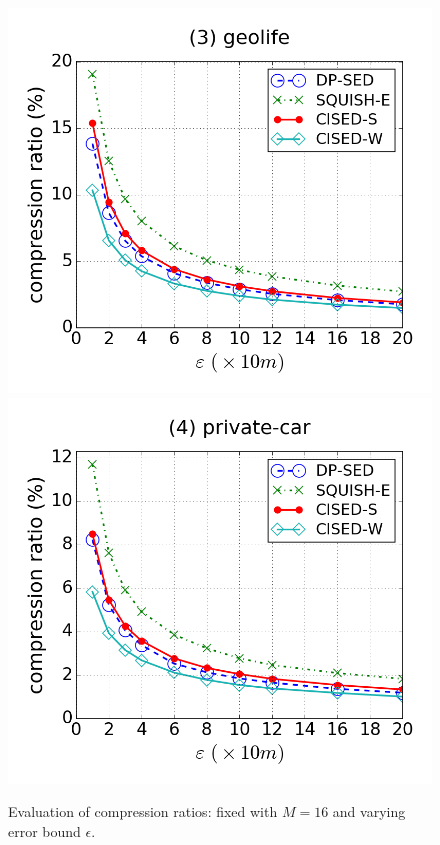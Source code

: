 \begin{figure}[tb!]
\includegraphics[scale = 0.250]{figures/Exp-cr-epsilon-geolife.png}
\includegraphics[scale = 0.250]{figures/Exp-cr-epsilon-private.png}
\vspace{-2ex}
\caption{\small Evaluation of compression ratios: fixed with $M=16$ and varying error bound $\epsilon$.}
\label{fig:cr-m16}
\vspace{-2.0ex}
\end{figure}


